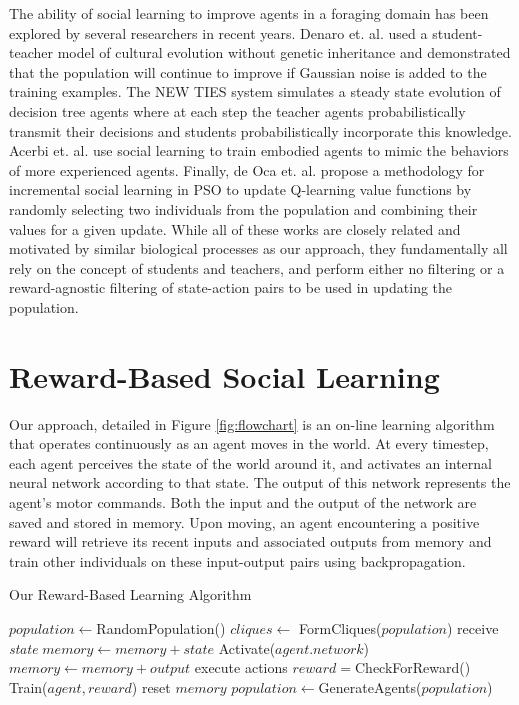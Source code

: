 \documentclass{acm_proc_article-sp}
\begin{document}
The ability of social learning to improve agents in a foraging domain has been explored by several researchers in recent years. Denaro et. al. \cite{denaro1996cultural} used a student-teacher model of cultural evolution without genetic inheritance and demonstrated that the population will continue to improve if Gaussian noise is added to the training examples. The NEW TIES system \cite{haasdijk2008social, vogt2010modeling} simulates a steady state evolution of decision tree agents where at each step the teacher agents probabilistically transmit their decisions and students probabilistically incorporate this knowledge. Acerbi et. al. \cite{acerbi2007social} use social learning to train embodied agents to mimic the behaviors of more experienced agents. Finally, de Oca et. al. \cite{de2011incremental} propose a methodology for incremental social learning in PSO to update Q-learning \cite{watkins1992q} value functions by randomly selecting two individuals from the population and combining their values for a given update. While all of these works are closely related and motivated by similar biological processes as our approach, they fundamentally all rely on the concept of students and teachers, and perform either no filtering or a reward-agnostic filtering of state-action pairs to be used in updating the population.


\section{Reward-Based Social Learning}
\label{sec:rbsl}

Our approach, detailed in Figure \ref{fig:flowchart} is an on-line learning algorithm that operates continuously as an agent moves in the world. At every timestep, each agent perceives the state of the world around it, and activates an internal neural network according to that state. The output of this network represents the agent's motor commands. Both the input and the output of the network are saved and stored in memory. Upon moving, an agent encountering a positive reward will retrieve its recent inputs and associated outputs from memory and train other individuals on these input-output pairs using backpropagation.

\begin{algorithm}
\caption{Our Reward-Based Learning Algorithm}
\label{reward-algo}
\begin{algorithmic}
\STATE $population \leftarrow$RandomPopulation()
\LOOP
{}
\STATE $cliques \leftarrow$ FormCliques($population$)
\STATE receive \textit{state}
\STATE $memory \leftarrow memory + state$
\STATE Activate($agent.network$)
\STATE $memory \leftarrow memory + output$
\ENDFOR
{}
\STATE execute actions
\STATE $reward=$CheckForReward()
\STATE Train($agent, reward$)
\ENDFOR
\STATE reset $memory$
\ENDIF
\ENDFOR
\ENDFOR
\ENDFOR
\STATE $population \leftarrow$GenerateAgents($population$)
\ENDFOR
\ENDLOOP
\end{algorithmic}
\end{algorithm}
\end{document}
